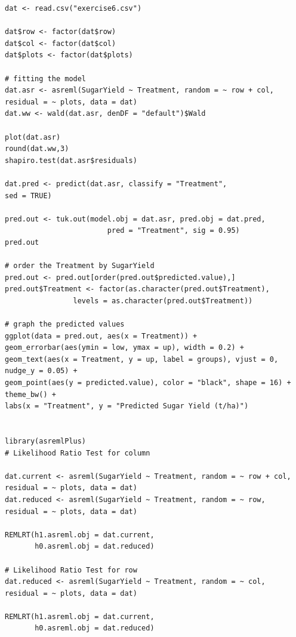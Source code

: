 \documentclass[a4paper, 10pt, fleqn, twosided]{memoir}
\begin{document}
\begin{tcolorbox}[title = Exercise 12 code]
\begin{verbatim}
dat <- read.csv("exercise6.csv")

dat$row <- factor(dat$row)
dat$col <- factor(dat$col)
dat$plots <- factor(dat$plots)

# fitting the model
dat.asr <- asreml(SugarYield ~ Treatment, random = ~ row + col,
residual = ~ plots, data = dat)
dat.ww <- wald(dat.asr, denDF = "default")$Wald

plot(dat.asr)
round(dat.ww,3)
shapiro.test(dat.asr$residuals)

dat.pred <- predict(dat.asr, classify = "Treatment",
sed = TRUE)

pred.out <- tuk.out(model.obj = dat.asr, pred.obj = dat.pred,
                        pred = "Treatment", sig = 0.95)
pred.out

# order the Treatment by SugarYield
pred.out <- pred.out[order(pred.out$predicted.value),]
pred.out$Treatment <- factor(as.character(pred.out$Treatment),
                levels = as.character(pred.out$Treatment))
 
# graph the predicted values 
ggplot(data = pred.out, aes(x = Treatment)) +
geom_errorbar(aes(ymin = low, ymax = up), width = 0.2) +
geom_text(aes(x = Treatment, y = up, label = groups), vjust = 0, nudge_y = 0.05) +
geom_point(aes(y = predicted.value), color = "black", shape = 16) + theme_bw() +
labs(x = "Treatment", y = "Predicted Sugar Yield (t/ha)")


library(asremlPlus)
# Likelihood Ratio Test for column

dat.current <- asreml(SugarYield ~ Treatment, random = ~ row + col,
residual = ~ plots, data = dat)
dat.reduced <- asreml(SugarYield ~ Treatment, random = ~ row,
residual = ~ plots, data = dat)

REMLRT(h1.asreml.obj = dat.current,
       h0.asreml.obj = dat.reduced)

# Likelihood Ratio Test for row
dat.reduced <- asreml(SugarYield ~ Treatment, random = ~ col,
residual = ~ plots, data = dat)

REMLRT(h1.asreml.obj = dat.current,
       h0.asreml.obj = dat.reduced)

\end{verbatim}
\end{tcolorbox}
\end{document}
